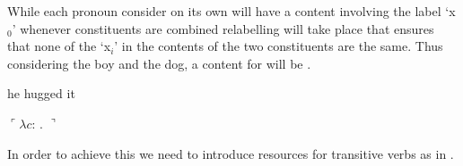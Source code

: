 While each pronoun consider on its own will have a content involving
the label `x$_0$' whenever constituents are combined relabelling will
take place that ensures that none of the `x$_i$' in the contents of
the two constituents are the same.
Thus considering the boy and the dog, a
content for  will be .
\begin{ex} 
\begin{subex} 
 
\item he hugged it 
 
\item $\ulcorner\lambda c$:
                                 . 
$\urcorner$ 
 
\end{subex} 
   
\end{ex}
In order to achieve this we need to introduce resources for transitive
verbs as in \nexteg{}.

